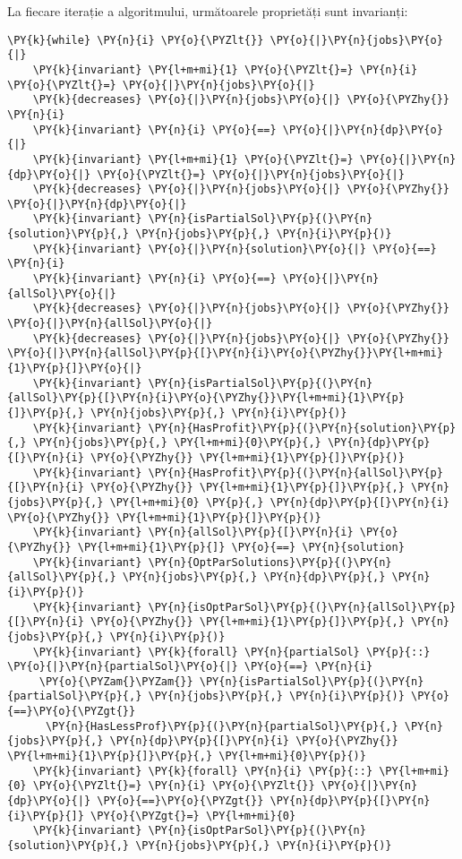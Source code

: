 La fiecare iterație a algoritmului, următoarele proprietăți sunt invarianți:
\begin{Verbatim}[commandchars=\\\{\},fontsize=\footnotesize]
\PY{k}{while} \PY{n}{i} \PY{o}{\PYZlt{}} \PY{o}{|}\PY{n}{jobs}\PY{o}{|}
    \PY{k}{invariant} \PY{l+m+mi}{1} \PY{o}{\PYZlt{}=} \PY{n}{i} \PY{o}{\PYZlt{}=} \PY{o}{|}\PY{n}{jobs}\PY{o}{|}
    \PY{k}{decreases} \PY{o}{|}\PY{n}{jobs}\PY{o}{|} \PY{o}{\PYZhy{}} \PY{n}{i}
    \PY{k}{invariant} \PY{n}{i} \PY{o}{==} \PY{o}{|}\PY{n}{dp}\PY{o}{|}
    \PY{k}{invariant} \PY{l+m+mi}{1} \PY{o}{\PYZlt{}=} \PY{o}{|}\PY{n}{dp}\PY{o}{|} \PY{o}{\PYZlt{}=} \PY{o}{|}\PY{n}{jobs}\PY{o}{|}
    \PY{k}{decreases} \PY{o}{|}\PY{n}{jobs}\PY{o}{|} \PY{o}{\PYZhy{}} \PY{o}{|}\PY{n}{dp}\PY{o}{|}
    \PY{k}{invariant} \PY{n}{isPartialSol}\PY{p}{(}\PY{n}{solution}\PY{p}{,} \PY{n}{jobs}\PY{p}{,} \PY{n}{i}\PY{p}{)}
    \PY{k}{invariant} \PY{o}{|}\PY{n}{solution}\PY{o}{|} \PY{o}{==} \PY{n}{i}
    \PY{k}{invariant} \PY{n}{i} \PY{o}{==} \PY{o}{|}\PY{n}{allSol}\PY{o}{|}
    \PY{k}{decreases} \PY{o}{|}\PY{n}{jobs}\PY{o}{|} \PY{o}{\PYZhy{}} \PY{o}{|}\PY{n}{allSol}\PY{o}{|}
    \PY{k}{decreases} \PY{o}{|}\PY{n}{jobs}\PY{o}{|} \PY{o}{\PYZhy{}} \PY{o}{|}\PY{n}{allSol}\PY{p}{[}\PY{n}{i}\PY{o}{\PYZhy{}}\PY{l+m+mi}{1}\PY{p}{]}\PY{o}{|}
    \PY{k}{invariant} \PY{n}{isPartialSol}\PY{p}{(}\PY{n}{allSol}\PY{p}{[}\PY{n}{i}\PY{o}{\PYZhy{}}\PY{l+m+mi}{1}\PY{p}{]}\PY{p}{,} \PY{n}{jobs}\PY{p}{,} \PY{n}{i}\PY{p}{)}
    \PY{k}{invariant} \PY{n}{HasProfit}\PY{p}{(}\PY{n}{solution}\PY{p}{,} \PY{n}{jobs}\PY{p}{,} \PY{l+m+mi}{0}\PY{p}{,} \PY{n}{dp}\PY{p}{[}\PY{n}{i} \PY{o}{\PYZhy{}} \PY{l+m+mi}{1}\PY{p}{]}\PY{p}{)}
    \PY{k}{invariant} \PY{n}{HasProfit}\PY{p}{(}\PY{n}{allSol}\PY{p}{[}\PY{n}{i} \PY{o}{\PYZhy{}} \PY{l+m+mi}{1}\PY{p}{]}\PY{p}{,} \PY{n}{jobs}\PY{p}{,} \PY{l+m+mi}{0} \PY{p}{,} \PY{n}{dp}\PY{p}{[}\PY{n}{i} \PY{o}{\PYZhy{}} \PY{l+m+mi}{1}\PY{p}{]}\PY{p}{)}
    \PY{k}{invariant} \PY{n}{allSol}\PY{p}{[}\PY{n}{i} \PY{o}{\PYZhy{}} \PY{l+m+mi}{1}\PY{p}{]} \PY{o}{==} \PY{n}{solution}
    \PY{k}{invariant} \PY{n}{OptParSolutions}\PY{p}{(}\PY{n}{allSol}\PY{p}{,} \PY{n}{jobs}\PY{p}{,} \PY{n}{dp}\PY{p}{,} \PY{n}{i}\PY{p}{)}
    \PY{k}{invariant} \PY{n}{isOptParSol}\PY{p}{(}\PY{n}{allSol}\PY{p}{[}\PY{n}{i} \PY{o}{\PYZhy{}} \PY{l+m+mi}{1}\PY{p}{]}\PY{p}{,} \PY{n}{jobs}\PY{p}{,} \PY{n}{i}\PY{p}{)}
    \PY{k}{invariant} \PY{k}{forall} \PY{n}{partialSol} \PY{p}{::} \PY{o}{|}\PY{n}{partialSol}\PY{o}{|} \PY{o}{==} \PY{n}{i} 
     \PY{o}{\PYZam{}\PYZam{}} \PY{n}{isPartialSol}\PY{p}{(}\PY{n}{partialSol}\PY{p}{,} \PY{n}{jobs}\PY{p}{,} \PY{n}{i}\PY{p}{)} \PY{o}{==}\PY{o}{\PYZgt{}}
      \PY{n}{HasLessProf}\PY{p}{(}\PY{n}{partialSol}\PY{p}{,} \PY{n}{jobs}\PY{p}{,} \PY{n}{dp}\PY{p}{[}\PY{n}{i} \PY{o}{\PYZhy{}} \PY{l+m+mi}{1}\PY{p}{]}\PY{p}{,} \PY{l+m+mi}{0}\PY{p}{)}
    \PY{k}{invariant} \PY{k}{forall} \PY{n}{i} \PY{p}{::} \PY{l+m+mi}{0} \PY{o}{\PYZlt{}=} \PY{n}{i} \PY{o}{\PYZlt{}} \PY{o}{|}\PY{n}{dp}\PY{o}{|} \PY{o}{==}\PY{o}{\PYZgt{}} \PY{n}{dp}\PY{p}{[}\PY{n}{i}\PY{p}{]} \PY{o}{\PYZgt{}=} \PY{l+m+mi}{0}
    \PY{k}{invariant} \PY{n}{isOptParSol}\PY{p}{(}\PY{n}{solution}\PY{p}{,} \PY{n}{jobs}\PY{p}{,} \PY{n}{i}\PY{p}{)}
\end{Verbatim}

